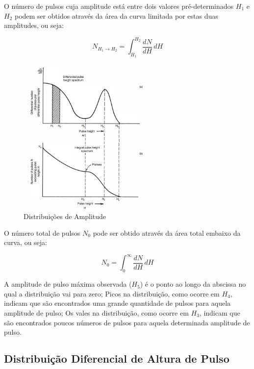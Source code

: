 \documentclass[11pt,a4paper]{article}
\begin{document}
			O número de pulsos cuja amplitude está entre dois valores pré-determinados $H_1$ e $H_2$ podem ser obtidos através da área da curva limitada por estas duas amplitudes, ou seja:

				\begin{equation}
					N_{H_1 \rightarrow  H_2} = \int_{H_1}^{H_2} \frac{dN}{dH}  \,dH 
				\end{equation}

				\begin{figure}[h]
					\centering
					\includegraphics[width=0.59\textwidth]{Imagens/distribuicaoDeAlturaDePulso.jpg}
					\caption{Distribuições de Amplitude}
					\label{fig:distribuicaoDeAlturaDePulso}
				\end{figure}

			O número total de pulsos $N_0$ pode ser obtido através da área total embaixo da curva, ou seja:

				\begin{equation}
					N_0 = \int_{0}^{\infty} \frac{dN}{dH} \,dH
				\end{equation}

			A amplitude de pulso máxima observada ($H_5$) é o ponto ao longo da abscissa no qual a distribuição vai para zero; Picos na distribuição, como ocorre em $H_4$, indicam que são encontrados uma grande quantidade de pulsos para aquela amplitude de pulso; Os vales na distribuição, como ocorre em $H_3$, indicam que são encontrados poucos números de pulsos para aquela determinada amplitude de pulso. 

		\subsection{Distribuição Diferencial de Altura de Pulso}
\end{document}
